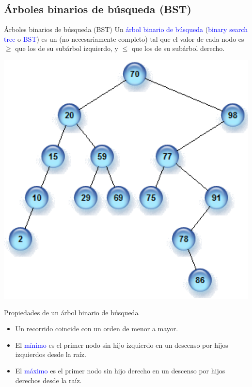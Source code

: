 \documentclass[handout]{beamer} %
\newcommand{\blue}[1]{\textcolor{blue}{#1}}
\newcommand{\redb}[1]{{\color{red!70!black}{#1}}}
\begin{document}
\subsection{Árboles binarios de búsqueda (BST)}

\begin{frame}{Árboles binarios de búsqueda (BST)}
    Un \blue{árbol binario de búsqueda} (\blue{binary search tree} o \blue{BST}) es un \redb{árbol binario} (no necesariamente completo) tal que el valor de cada nodo es $\geq$ que los de su subárbol izquierdo, y $\leq$ que los de su subárbol derecho.
    \begin{center}
        \includegraphics[width=.5\textwidth]{./image/cap3/BST}
    \end{center}
\end{frame}

\begin{frame}{Propiedades de un árbol binario de búsqueda}
    \begin{itemize}
        \item<1-> Un recorrido \redb{inorden} coincide con un orden de menor a mayor.
        \item<2-> El \blue{mínimo} es el primer nodo sin hijo izquierdo en un descenso por hijos izquierdos desde la raíz.
        \item<3-> El \blue{máximo} es el primer nodo sin hijo derecho en un descenso por hijos derechos desde la raíz.
    \end{itemize}
\end{frame}
\end{document}
